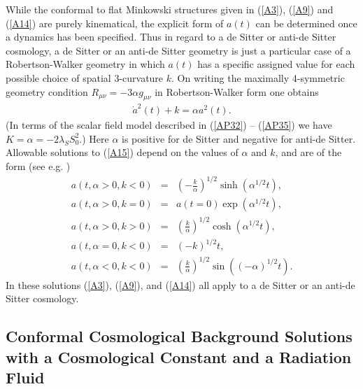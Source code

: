 \documentclass[aps]{revtex4}
\begin{document}
While the conformal to flat Minkowski structures given in (\ref{A3}), (\ref{A9}) and (\ref{A14}) are purely kinematical, the explicit form of $a(t)$ can be determined once a dynamics has been specified. Thus in regard to a de Sitter or anti-de Sitter cosmology, a de Sitter or an anti-de Sitter geometry is  just a particular case of a Robertson-Walker geometry in which $a(t)$ has a specific assigned value for each possible choice of  spatial 3-curvature $k$. On writing the  maximally 4-symmetric geometry condition $R_{\mu\nu}=-3\alpha g_{\mu\nu}$ in Robertson-Walker form one obtains 
%
\begin{eqnarray} 
\dot{a}^2(t) +k=\alpha  a^2(t).
\label{A15}
\end{eqnarray}
%
(In terms of the scalar field model described in (\ref{AP32}) -- (\ref{AP35}) we have $K=\alpha =-2\lambda_{S}S^2_0$.) Here $\alpha$ is positive for de Sitter and negative for anti-de Sitter. Allowable solutions to (\ref{A15}) depend on the values of $\alpha$ and $k$, and are of the form (see e.g. \cite{Mannheim2006})
%
\begin{eqnarray}
a(t,\alpha>0,k<0)&=&\left(-\frac{k}{\alpha}\right)^{1/2}
\sinh(\alpha^{1/2}t),
\nonumber \\
a(t,\alpha>0,k=0)&=&a(t=0)\exp(\alpha^{1/2}t),
\nonumber \\
a(t,\alpha>0,k>0)&=&\left(\frac{k}{\alpha}\right)^{1/2}\cosh(\alpha^{1/2}t),
\nonumber \\
a(t,\alpha=0,k<0)&=&(-k)^{1/2}t,
\nonumber \\
a(t,\alpha<0,k<0)&=&\left(\frac{k}{\alpha}\right)^{1/2}\sin((-\alpha)^{1/2}t).
\label{A16}
\end{eqnarray}
%
In these solutions (\ref{A3}), (\ref{A9}), and (\ref{A14}) all apply  to a de Sitter or an anti-de Sitter cosmology.

\subsection{Conformal Cosmological Background Solutions with a Cosmological Constant and a Radiation Fluid}
\end{document}
